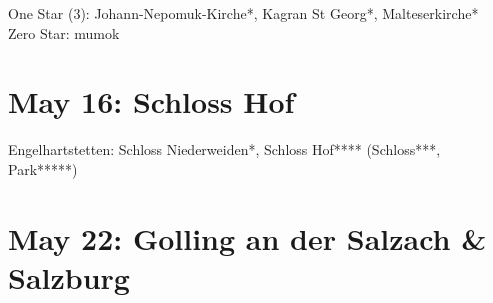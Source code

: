 One Star (3): Johann-Nepomuk-Kirche*, Kagran St Georg*, Malteserkirche*\\

Zero Star: mumok

\section{May 16: Schloss Hof}
\label{2021SchlossHof}

Engelhartstetten: Schloss Niederweiden*, Schloss Hof**** (Schloss***, Park*****)

\section{May 22: Golling an der Salzach \& Salzburg}
\label{2021GollingSalzburg}

